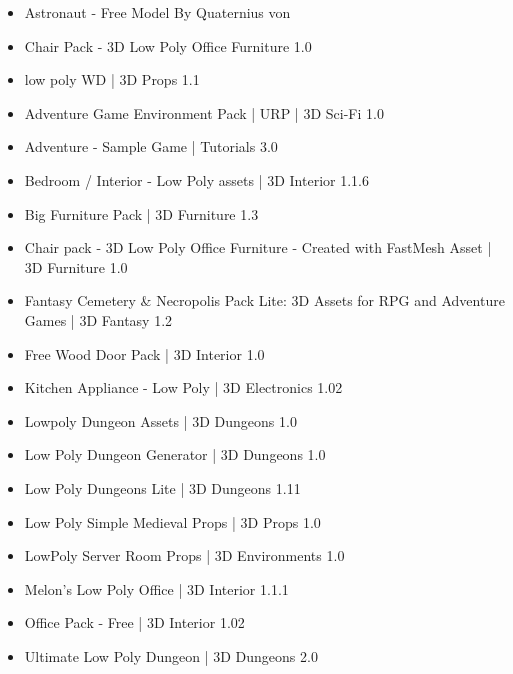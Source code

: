 \begin{itemize}  
    \item Astronaut - Free Model By Quaternius von \cite{quaternius_astronaut_nodate}
    \item Chair Pack - 3D Low Poly Office Furniture 1.0 \cite{fast_mesh_chair_nodate}
    \item low poly WD | 3D Props 1.1 \cite{squid_low_nodate}
    \item Adventure Game Environment Pack | URP | 3D Sci-Fi 1.0 \cite{unity_technologies_adventure_nodate-1}
    \item Adventure - Sample Game | Tutorials 3.0 \cite{unity_technologies_adventure_nodate}
    \item Bedroom / Interior - Low Poly assets | 3D Interior 1.1.6 \cite{fries_and_seagull_bedroom_nodate}
    \item Big Furniture Pack | 3D Furniture 1.3 \cite{vertex_studio_big_nodate}
    \item Chair pack - 3D Low Poly Office Furniture - Created with FastMesh Asset | 3D Furniture 1.0 \cite{fast_mesh_chair_nodate}
    \item Fantasy Cemetery \& Necropolis Pack Lite: 3D Assets for RPG and Adventure Games | 3D Fantasy 1.2 \cite{emaceart_fantasy_nodate}
    \item Free Wood Door Pack | 3D Interior 1.0 \cite{biostart_free_nodate}
    \item Kitchen Appliance - Low Poly | 3D Electronics 1.02 \cite{alstra_infinite_kitchen_nodate}
    \item Lowpoly Dungeon Assets | 3D Dungeons 1.0 \cite{kunniki_lowpoly_nodate}
    \item Low Poly Dungeon Generator | 3D Dungeons 1.0 \cite{mysticforge_low_nodate}
    \item Low Poly Dungeons Lite | 3D Dungeons 1.11 \cite{justcreate_low_nodate-1}
    \item Low Poly Simple Medieval Props | 3D Props 1.0 \cite{justcreate_low_nodate}
    \item LowPoly Server Room Props | 3D Environments 1.0 \cite{ipoly3d_lowpoly_nodate}
    \item Melon's Low Poly Office | 3D Interior 1.1.1 \cite{mistyczny_arbuz_melons_nodate}
    \item Office Pack - Free | 3D Interior 1.02 \cite{nappin_office_nodate}
    \item Ultimate Low Poly Dungeon | 3D Dungeons 2.0 \cite{broken_vector_ultimate_nodate}
\end{itemize}

